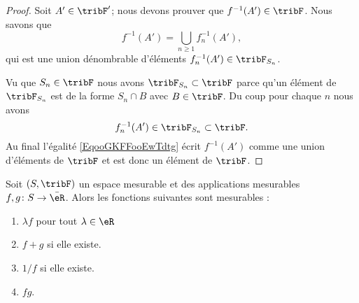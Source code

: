 \begin{proof}
    Soit \( A'\in\tribF'\); nous devons prouver que \( f^{-1}(A')\in \tribF\). Nous savons que
    \begin{equation}        \label{EqooGKFFooEwTdtg}
        f^{-1}(A')=\bigcup_{n\geq 1}f_n^{-1}(A'),
    \end{equation}
    qui est une union dénombrable d'éléments \( f_n^{-1}(A')\in\tribF_{S_n}\).

    Vu que \( S_n\in \tribF\) nous avons \( \tribF_{S_n}\subset\tribF\) parce qu'un élément de \( \tribF_{S_n}\) est de la forme \( S_n\cap B\) avec \( B\in\tribF\). Du coup pour chaque \( n\) nous avons
    \begin{equation}
        f_n^{-1}(A')\in\tribF_{S_n}\subset \tribF.
    \end{equation}
    Au final l'égalité \eqref{EqooGKFFooEwTdtg} écrit \( f^{-1}(A')\) comme une union d'éléments de \( \tribF\) et est donc un élément de \( \tribF\).
\end{proof}

\begin{proposition}     \label{PROPooODDVooEEmmTX}
    Soit \( (S,\tribF)\) un espace mesurable et des applications mesurables \( f,g\colon S\to \bar \eR\). Alors les fonctions suivantes sont mesurables :
    \begin{enumerate}
        \item
            \( \lambda f\) pour tout \( \lambda\in \eR\)
        \item
            \( f+g\) si elle existe.
        \item
            \( 1/f\) si elle existe.
        \item
            \( fg\).
    \end{enumerate}
\end{proposition}

